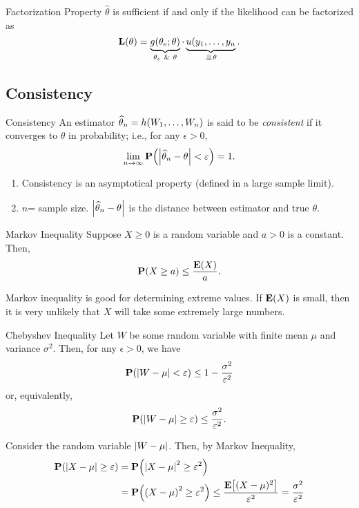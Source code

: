 \begin{thm}{Factorization Property}
	$\hat\theta$ is sufficient if and only if the likelihood can be factorized as \[\L(\theta)=\underbrace{g(\theta_e;\theta)}_{\theta_e\ \&\ \theta}\cdot \underbrace{u(y_1,\dots,y_n}_{\independ\theta}.\]	
\end{thm}

\subsection{Consistency}
\begin{df}{Consistency}
	An estimator $\widehat\theta_n=h\qty(W_1,\dots,W_n)$ is said to be \textit{consistent} if it converges to $\theta$ in probability; i.e., for any $\epsilon>0$, \[\lim_{n\to\infty}\vb{P}\qty(\abs{\widehat\theta_n-\theta}<\varepsilon)=1.\]
\end{df}
\begin{rmk}
\begin{enumerate}
	\item Consistency is an asymptotical property (defined in a large sample limit).
	\item $n$= sample size. $\abs{\widehat\theta_n-\theta}$ is the distance between estimator and true $\theta$.
\end{enumerate}	
\end{rmk}
\begin{lem}{Markov Inequality}
	Suppose $X\geq0$ is a random variable and $a>0$ is a constant. Then, \[\vb{P}(X\geq a)\leq\dfrac{\vb{E}(X)}{a}.\]
\end{lem}
\begin{rmk}
	Markov inequality is good for determining extreme values. If $\vb{E}(X)$ is small, then it is very unlikely that $X$ will take some extremely large numbers. 	
\end{rmk}
\begin{thm}{Chebyshev Inequality}
	Let $W$ be some random variable with finite mean $\mu$ and variance $\sigma^2$. Then, for any $\epsilon>0$, we have \[\vb{P}\qty(\qty|W-\mu|<\varepsilon)\leq 1-\dfrac{\sigma^2}{\varepsilon^2}\] or, equivalently, \[\vb{P}\qty(\qty|W-\mu|\geq\varepsilon)\leq\dfrac{\sigma^2}{\varepsilon^2}.\]
\end{thm}
\begin{prf}
	Consider the random variable $\abs{W-\mu}$. Then, by Markov Inequality, \begin{align*}\vb{P}\qty(\abs{X-\mu}\geq\varepsilon)&=\vb{P}\qty(\abs{X-\mu}^2\geq\varepsilon^2)\\&=\vb{P}\qty(\qty(X-\mu)^2\geq\varepsilon^2)\leq\dfrac{\vb{E}\qty[(X-\mu)^2]}{\varepsilon^2}=\dfrac{\sigma^2}{\varepsilon^2}\end{align*}	
\end{prf}
